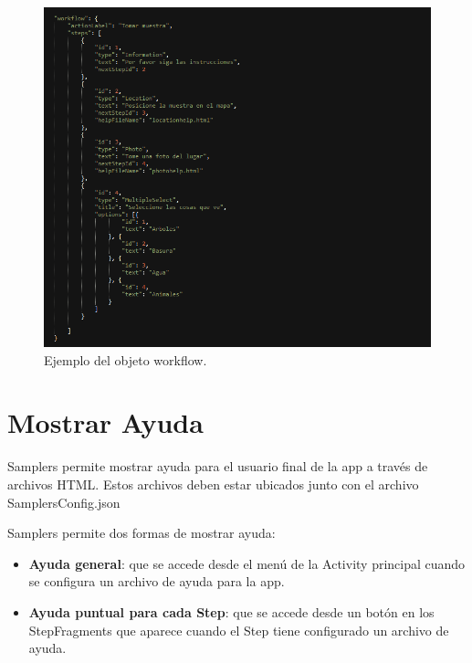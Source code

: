 	
\begin{figure}[H]
  \centering
    \includegraphics[scale=0.6]{50-anexos/B-uso/json_workflow.png} 
    \caption{Ejemplo del objeto workflow.}
\end{figure}	
		



\section{Mostrar Ayuda} \label{sec:mostrar_ayuda}
Samplers permite mostrar ayuda para el usuario final de la app a través de archivos HTML. Estos archivos deben estar ubicados junto con el archivo SamplersConfig.json

Samplers permite dos formas de mostrar ayuda:

\begin{itemize}

	\item \textbf{Ayuda general}: que se accede desde el menú de la Activity principal cuando se configura un archivo de ayuda para la app.
		
	\item \textbf{Ayuda puntual para cada Step}: que se accede desde un botón en los StepFragments que aparece cuando el Step tiene configurado un archivo de ayuda.

\end{itemize}


